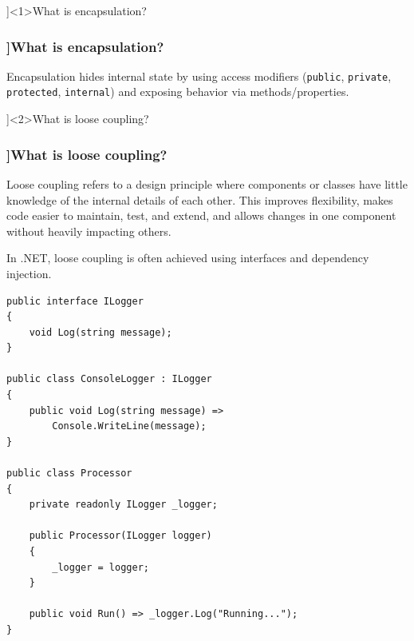 \QuestionSlide[\CategoryBadge[OOPColor!20]{OOP}]<1>{What is encapsulation?}

\begin{frame}[fragile]
  \frametitle{\AnswerTitle[\CategoryBadge[OOPColor!20]{OOP}]{What is encapsulation?}}

  {\footnotesize
  Encapsulation hides internal state by using access modifiers (\texttt{public}, \texttt{private}, \texttt{protected}, \texttt{internal}) and exposing behavior via methods/properties.
  }
\end{frame}

\QuestionSlide[\CategoryBadge[OOPColor!20]{OOP}]<2>{What is loose coupling?}

\begin{frame}[fragile]
  \frametitle{\AnswerTitle[\CategoryBadge[OOPColor!20]{OOP}]{What is loose coupling?}}

  {\footnotesize
  Loose coupling refers to a design principle where components or classes have little knowledge of the internal details of each other. This improves flexibility, makes code easier to maintain, test, and extend, and allows changes in one component without heavily impacting others.

  In .NET, loose coupling is often achieved using interfaces and dependency injection.
  }

    \begin{verbatim}
public interface ILogger
{
    void Log(string message);
}

public class ConsoleLogger : ILogger
{
    public void Log(string message) =>
        Console.WriteLine(message);
}

public class Processor
{
    private readonly ILogger _logger;

    public Processor(ILogger logger)
    {
        _logger = logger;
    }

    public void Run() => _logger.Log("Running...");
}
  \end{verbatim}
\end{frame}
